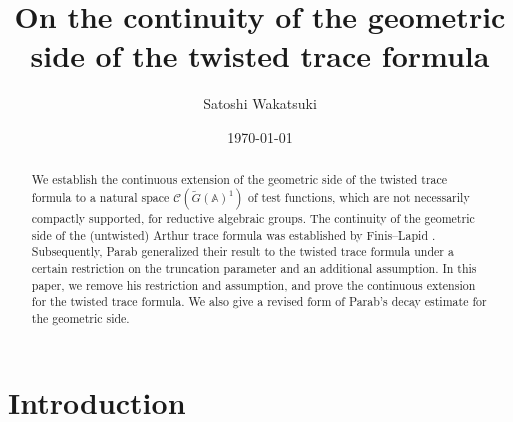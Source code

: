 \documentclass[12pt]{amsart}
\theoremstyle{definition}
\theoremstyle{plain}
\theoremstyle{remark}
\def\A{\mathbb{A}}%
\newcommand{\cC}{\mathcal{C}}
\numberwithin{equation}{section}
\newcommand{\tG}{\widetilde{G}}
\begin{document}
\title{On the continuity of the geometric side of the twisted trace formula}


\author{Satoshi Wakatsuki}
\address{Faculty of Mathematics and Physics, Institute of Science and Engineering, Kanazawa University, Kakumamachi, Kanazawa, Ishikawa, 920-1192, Japan}


\date{\today}

\begin{abstract}
We establish the continuous extension of the geometric side of the twisted trace formula to a natural space $\cC(\tG(\A)^1)$ of test functions, which are not necessarily compactly supported, for reductive algebraic groups. 
The continuity of the geometric side of the (untwisted) Arthur trace formula was established by Finis--Lapid \cites{FL11semi,FL16}. 
Subsequently, Parab \cite{Par19} generalized their result to the twisted trace formula under a certain restriction on the truncation parameter and an additional assumption.
In this paper, we remove his restriction and assumption, and prove the continuous extension for the twisted trace formula. 
We also give a revised form of Parab's decay estimate for the geometric side.
\end{abstract}

\maketitle

\tableofcontents

\section{Introduction}\label{sec:intro}
\end{document}
